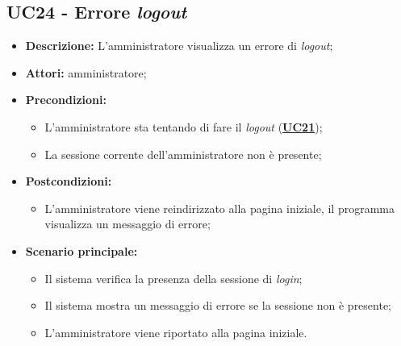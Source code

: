 \subsection{UC24 - Errore \textit{logout}}
\label{sec:UC24}
\begin{itemize}
	\item \textbf{Descrizione:} L’amministratore visualizza un errore di \textit{logout};
	\item \textbf{Attori:} amministratore;
	\item \textbf{Precondizioni:} 
	\begin{itemize}
		\item L’amministratore sta tentando di fare il \textit{logout} (\hyperref[sec:UC21]{\textbf{UC21}});
		\item La sessione corrente dell'amministratore non è presente;
	\end{itemize}
	\item \textbf{Postcondizioni:} 
	\begin{itemize}
		\item L'amministratore viene reindirizzato alla pagina iniziale, il programma visualizza un messaggio di errore;
	\end{itemize}
	\item \textbf{Scenario principale:} 
	\begin{itemize}
		\item Il sistema verifica la presenza della sessione di \textit{login};
		\item Il sistema mostra un messaggio di errore se la sessione non è presente;
		\item L'amministratore viene riportato alla pagina iniziale.
	\end{itemize}
\end{itemize}

